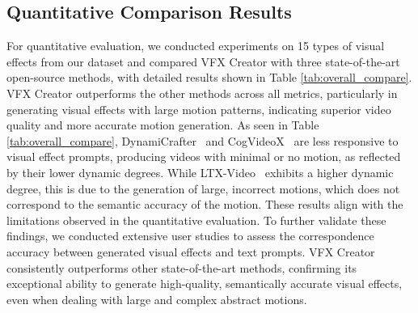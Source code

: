\subsection{Quantitative Comparison Results}
For quantitative evaluation, we conducted experiments on 15 types of visual effects from our dataset and compared VFX Creator with three state-of-the-art open-source methods, with detailed results shown in Table \ref{tab:overall_compare}. VFX Creator outperforms the other methods across all metrics, particularly in generating visual effects with large motion patterns, indicating superior video quality and more accurate motion generation.
As seen in Table \ref{tab:overall_compare}, DynamiCrafter~\cite{xing2025dynamicrafter} and CogVideoX~\cite{yang2024cogvideox} are less responsive to visual effect prompts, producing videos with minimal or no motion, as reflected by their lower dynamic degrees. While LTX-Video~\cite{hacohen2024ltx} exhibits a higher dynamic degree, this is due to the generation of large, incorrect motions, which does not correspond to the semantic accuracy of the motion. These results align with the limitations observed in the quantitative evaluation.
To further validate these findings, we conducted extensive user studies to assess the correspondence accuracy between generated visual effects and text prompts. VFX Creator consistently outperforms other state-of-the-art methods, confirming its exceptional ability to generate high-quality, semantically accurate visual effects, even when dealing with large and complex abstract motions.

\begin{table}[h]
\centering
\caption{Quantitative comparisons of VFX video generation for 15 visual effects in our dataset.
}
\renewcommand{\arraystretch}{1} %
\label{tab:overall_compare}
\end{table}


